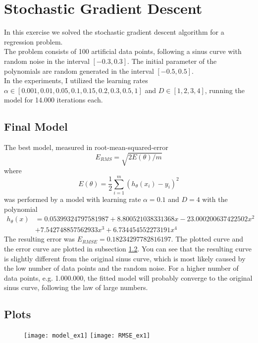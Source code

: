 \documentclass[a4paper,parskip=half-]{scrartcl}
\begin{document}
	\section{Stochastic Gradient Descent}
	In this exercise we solved the stochastic gradient descent algorithm for a regression problem.\\
	The problem consists of 100 artificial data points, following a sinus curve with random noise in the interval $[-0.3,0.3]$. The initial parameter of the polynomials are random generated in the interval $[-0.5,0.5]$.\\
	In the experiments, I utilized the learning rates $\alpha \in [0.001,0.01,0.05,0.1,0.15,0.2,0.3,0.5,1]$ and $D \in [1,2,3,4]$, running the model for 14.000 iterations each.
	\subsection{Final Model}
	
	The best model, measured in root-mean-squared-error $$E_{RMS} = \sqrt{2E(\theta)/m}$$ 
	where  $$E(\theta) = \frac{1}{2}\sum^{m}_{i=1}(h_{\theta}(x_i) - y_i)^2$$
	was performed by a model with learning rate $\alpha = 0.1$ and $D=4$ with the polynomial\\
	\begin{align*}
		h_{\theta}(x) &= 0.05399324797581987 + 8.800521038331368x -23.000200637422502x^2 \\&+ 7.542748857562933x^3 +6.734454552273191x^4
	\end{align*}
	The resulting error was $E_{RMSE} = 0.18234297782816197$. The plotted curve and the error curve are plotted in subsection \ref{plots}. You can see that the resulting curve is slightly different from the original sinus curve, which is most likely caused by the low number of data points and the random noise. For a higher number of data points, e.g. 1.000.000, the fitted model will probably converge to the original sinus curve, following the law of large numbers.
	\subsection{Plots}\label{plots}
	\begin{figure}
	\texttt{[image: model\_ex1]}
	\texttt{[image: RMSE\_ex1]}
	\end{figure}
\end{document}
